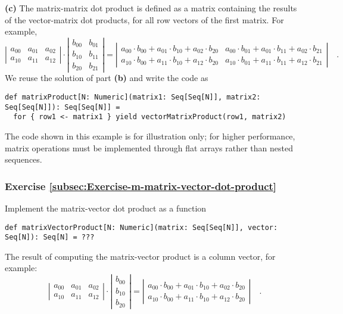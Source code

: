 \textbf{(c)} The matrix-matrix dot product is defined as a matrix
containing the results of the vector-matrix dot products, for all
row vectors of the first matrix. For example,
\[
\left|\begin{array}{ccc}
a_{00} & a_{01} & a_{02}\\
a_{10} & a_{11} & a_{12}
\end{array}\right|\cdot\left|\begin{array}{cc}
b_{00} & b_{01}\\
b_{10} & b_{11}\\
b_{20} & b_{21}
\end{array}\right|=\left|\begin{array}{cc}
a_{00}\cdot b_{00}+a_{01}\cdot b_{10}+a_{02}\cdot b_{20} & a_{00}\cdot b_{01}+a_{01}\cdot b_{11}+a_{02}\cdot b_{21}\\
a_{10}\cdot b_{00}+a_{11}\cdot b_{10}+a_{12}\cdot b_{20} & a_{10}\cdot b_{01}+a_{11}\cdot b_{11}+a_{12}\cdot b_{21}
\end{array}\right|\quad.
\]
We reuse the solution of part \textbf{(b)} and write the code as
\begin{lstlisting}
def matrixProduct[N: Numeric](matrix1: Seq[Seq[N]], matrix2: Seq[Seq[N]]): Seq[Seq[N]] =
  for { row1 <- matrix1 } yield vectorMatrixProduct(row1, matrix2)
\end{lstlisting}

The code shown in this example is for illustration only; for higher
performance, matrix operations must be implemented through flat arrays
rather than nested sequences.

\subsubsection{Exercise \label{subsec:Exercise-m-matrix-vector-dot-product}\ref{subsec:Exercise-m-matrix-vector-dot-product}}

Implement the matrix-vector dot product as a function
\begin{lstlisting}
def matrixVectorProduct[N: Numeric](matrix: Seq[Seq[N]], vector: Seq[N]): Seq[N] = ???
\end{lstlisting}
The result of computing the matrix-vector product is a column vector,
for example:
\[
\left|\begin{array}{ccc}
a_{00} & a_{01} & a_{02}\\
a_{10} & a_{11} & a_{12}
\end{array}\right|\cdot\left|\begin{array}{c}
b_{00}\\
b_{10}\\
b_{20}
\end{array}\right|=\left|\begin{array}{c}
a_{00}\cdot b_{00}+a_{01}\cdot b_{10}+a_{02}\cdot b_{20}\\
a_{10}\cdot b_{00}+a_{11}\cdot b_{10}+a_{12}\cdot b_{20}
\end{array}\right|\quad.
\]


